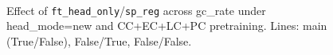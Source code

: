 \documentclass[diagnostics,article,submit,pdftex,moreauthors]{Definitions/mdpi}
\begin{document}
\begin{figure}
\centering
{}
\\
\caption{Effect of \texttt{ft\_head\_only}/\texttt{sp\_reg} across gc\_rate under head\_mode=new and CC+EC+LC+PC pretraining. Lines: main (True/False), False/True, False/False.}
\label{fig:transfer-combo-gcrate}
\end{figure}


\end{document}
